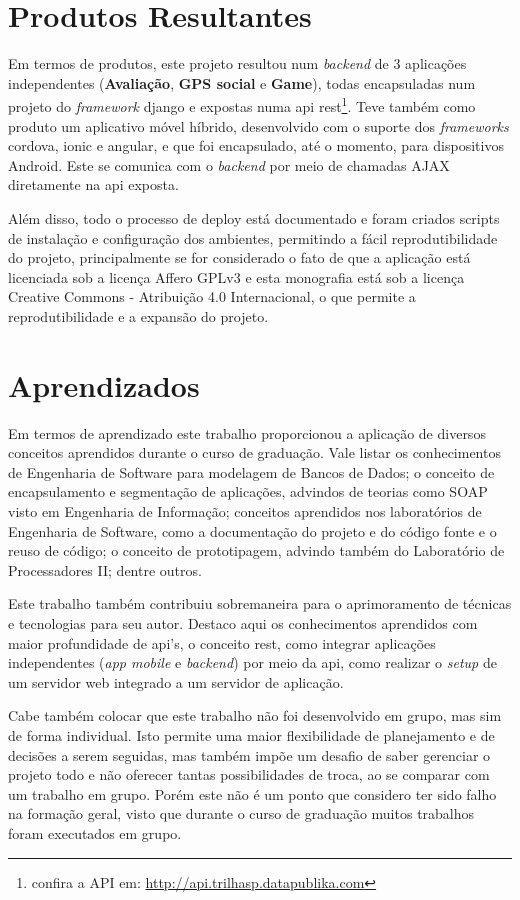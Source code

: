 \section{Produtos Resultantes}
Em termos de produtos, este projeto resultou num \textit{backend} de 3 aplicações independentes (\textbf{Avaliação}, \textbf{GPS social} e \textbf{Game}), todas encapsuladas num projeto do \textit{framework} \gls{django} e expostas numa \gls{api} \gls{rest}\footnote{confira a API em: \url{http://api.trilhasp.datapublika.com}}. Teve também como produto um aplicativo móvel híbrido, desenvolvido com o suporte dos \textit{frameworks} \gls{cordova}, \gls{ionic} e \gls{angular}, e que foi encapsulado, até o momento, para dispositivos Android. Este se comunica com o \textit{backend} por meio de chamadas AJAX diretamente na \gls{api} exposta.

Além disso, todo o processo de deploy está documentado e foram criados scripts de instalação e configuração dos ambientes, permitindo a fácil reprodutibilidade do projeto, principalmente se for considerado o fato de que a aplicação está licenciada sob a licença Affero GPLv3 e esta monografia está sob a licença Creative Commons - Atribuição 4.0 Internacional, o que permite a reprodutibilidade e a expansão do projeto.

\section{Aprendizados}
Em termos de aprendizado este trabalho proporcionou a aplicação de diversos conceitos aprendidos durante o curso de graduação. Vale listar os conhecimentos de Engenharia de Software para modelagem de Bancos de Dados; o conceito de encapsulamento e segmentação de aplicações, advindos de teorias como SOAP visto em Engenharia de Informação; conceitos aprendidos nos laboratórios de Engenharia de Software, como a documentação do projeto e do código fonte e o reuso de código; o conceito de prototipagem, advindo também do Laboratório de Processadores II; dentre outros.

Este trabalho também contribuiu sobremaneira para o aprimoramento de técnicas e tecnologias para seu autor. Destaco aqui os conhecimentos aprendidos com maior profundidade de \gls{api}'s, o conceito \gls{rest}, como integrar aplicações independentes (\textit{app mobile} e \textit{backend}) por meio da \gls{api}, como realizar o \textit{setup} de um servidor web integrado a um servidor de aplicação.

Cabe também colocar que este trabalho não foi desenvolvido em grupo, mas sim de forma individual. Isto permite uma maior flexibilidade de planejamento e de decisões a serem seguidas, mas também impõe um desafio de saber gerenciar o projeto todo e não oferecer tantas possibilidades de troca, ao se comparar com um trabalho em grupo. Porém este não é um ponto que considero ter sido falho na formação geral, visto que durante o curso de graduação muitos trabalhos foram executados em grupo.

